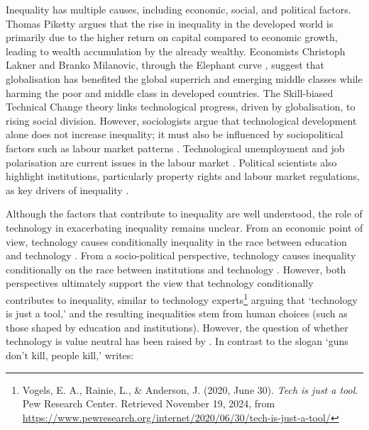 \documentclass[12pt]{article}
\begin{document}
Inequality has multiple causes, including economic, social, and political factors. Thomas Piketty \parencite*{piketty2014capital} argues that the rise in inequality in the developed world is primarily due to the higher return on capital compared to economic growth, leading to wealth accumulation by the already wealthy. Economists Christoph Lakner and Branko Milanovic, through the Elephant curve \parencite*{lakner2016global}, suggest that globalisation has benefited the global superrich and emerging middle classes while harming the poor and middle class in developed countries. The Skill-biased Technical Change theory \parencite{acemoglu2002technical} links technological progress, driven by globalisation, to rising social division. However, sociologists argue that technological development alone does not increase inequality; it must also be influenced by sociopolitical factors such as labour market patterns \parencite{morris1999inequality,neckerman2007inequality}. Technological unemployment and job polarisation are current issues in the labour market \parencite{spencer2018fear,fernandez2012job}. Political scientists also highlight institutions, particularly property rights and labour market regulations, as key drivers of inequality \parencite{boix2010origins}.

Although the factors that contribute to inequality are well understood, the role of technology in exacerbating inequality remains unclear. From an economic point of view, technology causes conditionally inequality in the race between education and technology \parencite{card2002skill}. From a socio-political perspective, technology causes inequality conditionally on the race between institutions and technology \parencite{kristal2017causes}. However, both perspectives ultimately support the view that technology conditionally contributes to inequality, similar to technology experts\footnote{Vogels, E. A., Rainie, L., \& Anderson, J. (2020, June 30). \textit{Tech is just a tool}. Pew Research Center. Retrieved November 19, 2024, from \href{https://www.pewresearch.org/internet/2020/06/30/tech-is-just-a-tool/}{https://www.pewresearch.org/internet/2020/06/30/tech-is-just-a-tool/} } arguing that `technology is just a tool,' and the resulting inequalities stem from human choices (such as those shaped by education and institutions). However, the question of whether technology is value neutral has been raised by \textcite{miller2021technology}. In contrast to the slogan `guns don’t kill, people kill,' \textcite{kroes2008morality} writes:
\end{document}

